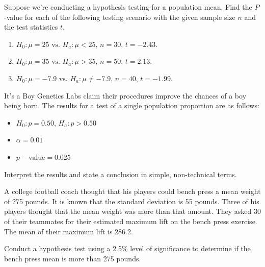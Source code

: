 \begin{exercise}

Suppose we're conducting a hypothesis testing for a population mean.
Find the \(P\)-value for each of the following testing scenario with the
given sample size \(n\) and the test statistics \(t\).

\begin{enumerate}
\item
  \(H_{0}: \mu=25 \text { vs. } H_{a} : \mu<25\), \(n=30\), \(t=-2.43\).
\item
  \(H_{0}: \mu=35 \text { vs. } H_{a} : \mu>35\), \(n=50\), \(t=2.13\).
\item
  \(H_{0}: \mu=-7.9 \text { vs. } H_{a} : \mu\ne-7.9\), \(n=40\),
  \(t=-1.99\).
\end{enumerate}

\end{exercise}

\begin{exercise}

It's a Boy Genetics Labs claim their procedures improve the chances of a
boy being born. The results for a test of a single population proportion
are as follows:

\begin{itemize}
\item
  \(H_0: p=0.50\), \(H_a:p>0.50\)
\item
  \(\alpha=0.01\)
\item
  \(p-\text{value}=0.025\)
\end{itemize}

Interpret the results and state a conclusion in simple, non-technical
terms.

\end{exercise}

\vspace*{8\baselineskip}


\begin{exercise}

A college football coach thought that his players could bench press a
mean weight of 275 pounds. It is known that the standard deviation is 55
pounds. Three of his players thought that the mean weight was more than
that amount. They asked 30 of their teammates for their estimated
maximum lift on the bench press exercise. The mean of their maximum lift
is 286.2.

Conduct a hypothesis test using a 2.5\% level of significance to
determine if the bench press mean is more than 275 pounds.

\end{exercise}
\vspace*{8\baselineskip}


